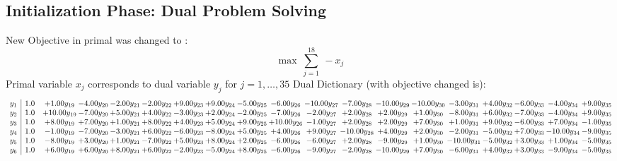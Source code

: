 \documentclass[9pt]{article}
\begin{document}
\subsection{Initialization Phase: Dual Problem Solving}
New Objective in primal was changed to : \[ \max\ \sum_{j=1}^{18}\ - x_j \] 
Primal variable $x_j$ corresponds to dual variable $y_j$ for $j = 1,\ldots,35$
Dual Dictionary (with objective changed is): 
\[\begin{array}{c| c c@{\hskip 2pt} c@{\hskip 2pt} c@{\hskip 2pt} c@{\hskip 2pt} c@{\hskip 2pt} c@{\hskip 2pt} c@{\hskip 2pt} c@{\hskip 2pt} c@{\hskip 2pt} c@{\hskip 2pt} c@{\hskip 2pt} c@{\hskip 2pt} c@{\hskip 2pt} c@{\hskip 2pt} c@{\hskip 2pt} c@{\hskip 2pt} c@{\hskip 2pt} }
 y_{1}   &  1.0 & +  1.00 y_{19} & -4.00 y_{20} & -2.00 y_{21} & -2.00 y_{22} & +  9.00 y_{23} & +  9.00 y_{24} & -5.00 y_{25} & -6.00 y_{26} & -10.00 y_{27} & -7.00 y_{28} & -10.00 y_{29} & -10.00 y_{30} & -3.00 y_{31} & +  4.00 y_{32} & -6.00 y_{33} & -4.00 y_{34} & +  9.00 y_{35}\\
 y_{2}   &  1.0 & + 10.00 y_{19} & -7.00 y_{20} & +  5.00 y_{21} & +  4.00 y_{22} & -3.00 y_{23} & +  2.00 y_{24} & -2.00 y_{25} & -7.00 y_{26} & -2.00 y_{27} & +  2.00 y_{28} & +  2.00 y_{29} & +  1.00 y_{30} & -8.00 y_{31} & +  6.00 y_{32} & -7.00 y_{33} & -4.00 y_{34} & +  9.00 y_{35}\\
 y_{3}   &  1.0 & +  8.00 y_{19} & +  7.00 y_{20} & +  1.00 y_{21} & +  8.00 y_{22} & +  4.00 y_{23} & +  5.00 y_{24} & +  9.00 y_{25} & + 10.00 y_{26} & -1.00 y_{27} & +  2.00 y_{28} & +  2.00 y_{29} & +  7.00 y_{30} & +  1.00 y_{31} & +  9.00 y_{32} & -6.00 y_{33} & +  7.00 y_{34} & -1.00 y_{35}\\
 y_{4}   &  1.0 & -1.00 y_{19} & -7.00 y_{20} & -3.00 y_{21} & +  6.00 y_{22} & -6.00 y_{23} & -8.00 y_{24} & +  5.00 y_{25} & +  4.00 y_{26} & +  9.00 y_{27} & -10.00 y_{28} & +  4.00 y_{29} & +  2.00 y_{30} & -2.00 y_{31} & -5.00 y_{32} & +  7.00 y_{33} & -10.00 y_{34} & -9.00 y_{35}\\
 y_{5}   &  1.0 & -8.00 y_{19} & +  3.00 y_{20} & +  1.00 y_{21} & -7.00 y_{22} & +  5.00 y_{23} & +  8.00 y_{24} & +  2.00 y_{25} & -6.00 y_{26} & -6.00 y_{27} & +  2.00 y_{28} & -9.00 y_{29} & +  1.00 y_{30} & -10.00 y_{31} & -5.00 y_{32} & +  3.00 y_{33} & +  1.00 y_{34} & -5.00 y_{35}\\
 y_{6}   &  1.0 & +  6.00 y_{19} & +  6.00 y_{20} & +  8.00 y_{21} & +  6.00 y_{22} & -2.00 y_{23} & -5.00 y_{24} & +  8.00 y_{25} & -6.00 y_{26} & -9.00 y_{27} & -2.00 y_{28} & -10.00 y_{29} & +  7.00 y_{30} & -6.00 y_{31} & +  4.00 y_{32} & +  3.00 y_{33} & -9.00 y_{34} & -5.00 y_{35}\\

\end{array}\]
\end{document}
